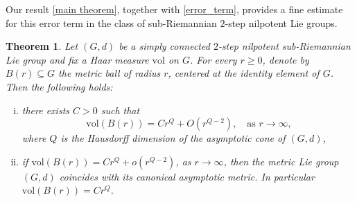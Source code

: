 \documentclass[a4paper,11pt,reqno]{amsart}
\theoremstyle{plain}
\newtheorem{theorem}{Theorem}[section]
\theoremstyle{definition}
\newcommand{\vol}{\mathrm{vol}}
\begin{document}
 
 Our result \cref{main theorem}, together with \cref{error_term}, provides a fine estimate for this error term in the class of sub-Riemannian $2$-step nilpotent Lie groups.

 \begin{theorem} \label{asymptotic_sphere}
 Let $(G,d)$ be a simply connected $2$-step nilpotent sub-Riemannian Lie group and fix a Haar measure $\vol$ on $G$. For every $r \ge 0$, denote by $B(r) \subseteq G$ the metric ball of radius $r$, centered at the identity element of $G$. Then the following holds:
 \begin{enumerate}[(i)]
 \item there exists $C > 0$ such that
 \begin{equation*}
 \vol(B(r)) = C r^Q + O(r^{Q-2}), \quad \text{as $r \to \infty$,}
 \end{equation*}
 where $Q$ is the Hausdorff dimension of the asymptotic cone of $(G,d)$,
 \item if $\vol(B(r)) = C r^Q + o(r^{Q-2})$, as $r \to \infty$, then the metric Lie group $(G,d)$ coincides with its canonical asymptotic metric. In particular $\vol(B(r)) = C r^Q$.
 \end{enumerate}
 \end{theorem}
\end{document}
